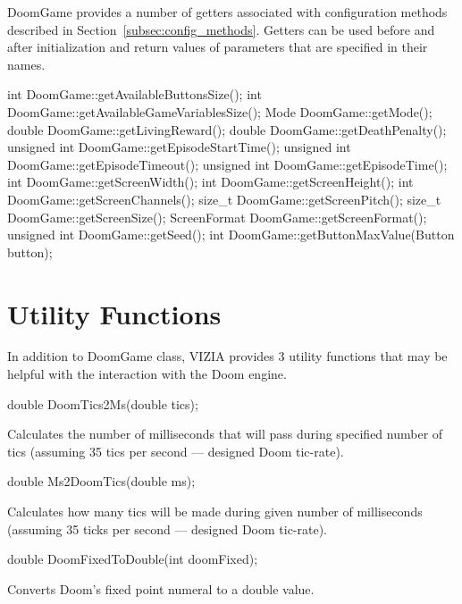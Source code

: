 \documentclass[english,bachelor,a4paper,twoside]{ppfcmthesis}
\begin{document}
	DoomGame provides a number of getters associated with configuration methods described in Section~\ref{subsec:config_methods}. Getters can be used before and after initialization and return values of parameters that are specified in their names.


\vspace{20pt}
\begin{clinee}
int DoomGame::getAvailableButtonsSize();
int DoomGame::getAvailableGameVariablesSize();
Mode DoomGame::getMode();
double DoomGame::getLivingReward();
double DoomGame::getDeathPenalty();
unsigned int DoomGame::getEpisodeStartTime();
unsigned int DoomGame::getEpisodeTimeout();
unsigned int DoomGame::getEpisodeTime();
int DoomGame::getScreenWidth();
int DoomGame::getScreenHeight();
int DoomGame::getScreenChannels();
size_t DoomGame::getScreenPitch();
size_t DoomGame::getScreenSize();
ScreenFormat DoomGame::getScreenFormat();
unsigned int DoomGame::getSeed();
int DoomGame::getButtonMaxValue(Button button);
\end{clinee}


\section {Utility Functions}
	In addition to DoomGame class, VIZIA provides 3 utility functions that may be helpful with the interaction with the Doom engine.

\vspace{20pt}
\begin{clinee}
	double DoomTics2Ms(double tics);
\end{clinee}

	Calculates the number of milliseconds that will pass during specified number of tics (assuming 35 tics per second --- designed Doom tic-rate).


\vspace{20pt}
\begin{clinee}
	double Ms2DoomTics(double ms);
\end{clinee}

	Calculates how many tics will be made during given number of milliseconds (assuming 35 ticks per second --- designed Doom tic-rate).


\vspace{20pt}
\begin{clinee}
	double DoomFixedToDouble(int doomFixed);
\end{clinee}

	Converts Doom's fixed point numeral to a double value.
\end{document}
